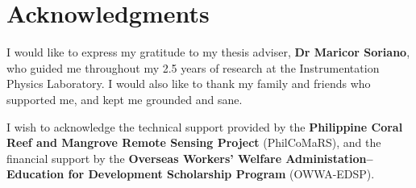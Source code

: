\chapter*{Acknowledgments}

I would like to express my gratitude to my thesis adviser, \textbf{Dr Maricor Soriano}, who guided me throughout my 2.5 years of research at the Instrumentation Physics Laboratory. I would also like to thank my family and friends who supported me, and kept me grounded and sane.

I wish to acknowledge the technical support provided by the \textbf{Philippine Coral Reef and Mangrove Remote Sensing Project} (PhilCoMaRS), and the financial support by the \textbf{Overseas Workers' Welfare Administation--Education for Development Scholarship Program} (OWWA-EDSP).